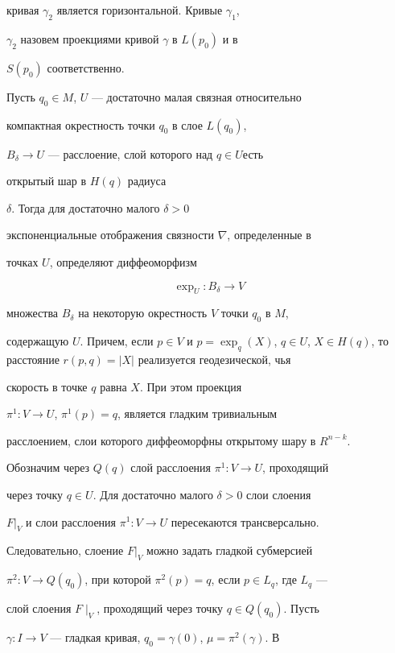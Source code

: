 кривая $\gamma_2$ является горизонтальной. Кривые $\gamma_1$, 


$\gamma_2$ назовем проекциями кривой $\gamma$ в $L(p_0)$ и в 


$S(p_0)$ соответственно.





Пусть $q_0\in M$, $U$ --- достаточно малая связная относительно 


компактная окрестность точки $q_0$ в слое $L(q_0)$,


$B_\delta\to U$ --- расслоение, слой которого над $q\in U$есть


открытый шар в $H(q)$ радиуса


$\delta$. Тогда для достаточно малого $\delta >0$


экспоненциальные отображения связности $\nabla$, определенные в 


точках $U$, определяют диффеоморфизм


$$


\exp_U:B_\delta \to V


$$


множества $B_\delta$ на некоторую окрестность $V$ точки $q_0$ в $M$, 


содержащую $U$. Причем, если $p\in V$ и $p= \exp_q(X)$, $q \in U$, $X \in 


H(q)$, то расстояние $r(p,q)=|X|$ реализуется геодезической, чья 


скорость в точке $q$ равна $X$. При этом проекция 


$\pi^1:V\to U$, $\pi^1(p)=q$, является гладким тривиальным 


расслоением, слои которого диффеоморфны открытому шару в $R^{n-k}$. 


Обозначим через $Q(q)$ слой расслоения $\pi^1:V\to U$, проходящий 


через точку $q\in U$. Для достаточно малого $\delta >0$ слои слоения 


$F|_V$ и слои расслоения $\pi^1:V\to U$ пересекаются трансверсально. 


Следовательно, слоение $F|_V$ можно задать гладкой субмерсией 


$\pi^2:V\to Q(q_0)$, при которой $\pi^2(p)=q$, если $p\in L_q$, где $L_q$ --- 


слой слоения $F \mid_V$, проходящий через точку $q\in Q(q_0)$. Пусть 


$\gamma:I\to V$ --- гладкая кривая, $q_0=\gamma (0)$, $\mu=\pi^2(\gamma)$. В 


